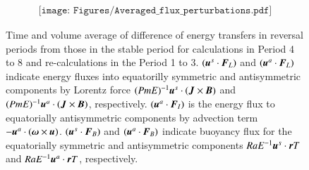 \begin{figure}[ht]
\begin{center}
\[
\begin{array}{c}
\texttt{[image: Figures/Averaged\_flux\_perturbations.pdf]}
\end{array}
\]
\end{center}
\caption{
 Time and volume average of difference of energy transfers in reversal periods from those in the stable period for calculations in Period 4 to 8 and re-calculations in the Period 1 to 3. 
 $(\mbox{\boldmath$u$}^s \cdot \mbox{\boldmath$F$}_{L})$ and $(\mbox{\boldmath$u$}^a \cdot \mbox{\boldmath$F$}_{L})$ indicate energy fluxes into equatorilly symmetric and antisymmetric components by Lorentz force $(Pm E)^{-1} \mbox{\boldmath$u$}^s \cdot (\mbox{\boldmath$J$} \times \mbox{\boldmath$B$})$ and $(Pm E)^{-1} \mbox{\boldmath$u$}^a \cdot (\mbox{\boldmath$J$} \times \mbox{\boldmath$B$})$, respectively. 
 $(\mbox{\boldmath$u$}^a \cdot \mbox{\boldmath$F$}_{I})$ is the energy flux to equatorially antisymmetric components by advection term $-\mbox{\boldmath$u$}^a \cdot(\mbox{\boldmath$\omega$} \times \mbox{\boldmath$u$})$. $(\mbox{\boldmath$u$}^s \cdot \mbox{\boldmath$F$}_{B})$ and $(\mbox{\boldmath$u$}^a \cdot \mbox{\boldmath$F$}_{B})$ indicate buoyancy flux for the equatorially symmetric and antisymmetric components $Ra E^{-1} \mbox{\boldmath$u$}^s \cdot \mbox{\boldmath$r$} T$ and $Ra E^{-1} \mbox{\boldmath$u$}^a \cdot \mbox{\boldmath$r$} T$, respectively.
}
\label{Fig:Change_flux_summary_6grp}
\end{figure}